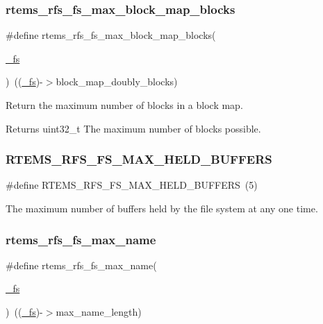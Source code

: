 \subsubsection{\texorpdfstring{rtems\_rfs\_fs\_max\_block\_map\_blocks}{rtems\_rfs\_fs\_max\_block\_map\_blocks}}
{\footnotesize\ttfamily \#define rtems\+\_\+rfs\+\_\+fs\+\_\+max\+\_\+block\+\_\+map\+\_\+blocks(\begin{DoxyParamCaption}\item[{}]{\mbox{\hyperlink{struct__fs}{\+\_\+fs}} }\end{DoxyParamCaption})~((\mbox{\hyperlink{struct__fs}{\+\_\+fs}})-\/$>$block\+\_\+map\+\_\+doubly\+\_\+blocks)}

Return the maximum number of blocks in a block map.

\begin{DoxyReturn}{Returns}
uint32\+\_\+t The maximum number of blocks possible. 
\end{DoxyReturn}
\mbox{\label{rtems-rfs-file-system_8h_a9fd0cd701de5912ac1e3a54a3ea3525f}} 
\subsubsection{\texorpdfstring{RTEMS\_RFS\_FS\_MAX\_HELD\_BUFFERS}{RTEMS\_RFS\_FS\_MAX\_HELD\_BUFFERS}}
{\footnotesize\ttfamily \#define R\+T\+E\+M\+S\+\_\+\+R\+F\+S\+\_\+\+F\+S\+\_\+\+M\+A\+X\+\_\+\+H\+E\+L\+D\+\_\+\+B\+U\+F\+F\+E\+RS~(5)}

The maximum number of buffers held by the file system at any one time. \mbox{\label{rtems-rfs-file-system_8h_adcf995ca24dfef0d825b9d1fc080a806}} 
\subsubsection{\texorpdfstring{rtems\_rfs\_fs\_max\_name}{rtems\_rfs\_fs\_max\_name}}
{\footnotesize\ttfamily \#define rtems\+\_\+rfs\+\_\+fs\+\_\+max\+\_\+name(\begin{DoxyParamCaption}\item[{}]{\mbox{\hyperlink{struct__fs}{\+\_\+fs}} }\end{DoxyParamCaption})~((\mbox{\hyperlink{struct__fs}{\+\_\+fs}})-\/$>$max\+\_\+name\+\_\+length)}


